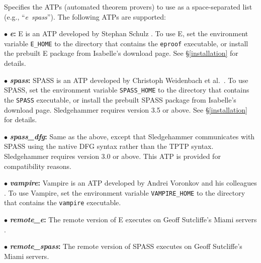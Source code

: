 \documentclass[a4paper,12pt]{article}
\begin{document}
\begin{enum}

Specifies the ATPs (automated theorem provers) to use as a space-separated list
(e.g., ``\textit{e}~\textit{spass}''). The following ATPs are supported:

\begin{enum}
\item[$\bullet$] \textbf{\textit{e}:} E is an ATP developed by Stephan Schulz
\cite{schulz-2002}. To use E, set the environment variable
\texttt{E\_HOME} to the directory that contains the \texttt{eproof} executable,
or install the prebuilt E package from Isabelle's download page. See
\S\ref{installation} for details.

\item[$\bullet$] \textbf{\textit{spass}:} SPASS is an ATP developed by Christoph
Weidenbach et al.\ \cite{weidenbach-et-al-2009}. To use SPASS, set the
environment variable \texttt{SPASS\_HOME} to the directory that contains the
\texttt{SPASS} executable, or install the prebuilt SPASS package from Isabelle's
download page. Sledgehammer requires version 3.5 or above. See
\S\ref{installation} for details.

\item[$\bullet$] \textbf{\textit{spass\_dfg}:} Same as the above, except that
Sledgehammer communicates with SPASS using the native DFG syntax rather than the
TPTP syntax. Sledgehammer requires version 3.0 or above. This ATP is provided
for compatibility reasons.

\item[$\bullet$] \textbf{\textit{vampire}:} Vampire is an ATP developed by
Andrei Voronkov and his colleagues \cite{riazanov-voronkov-2002}. To use
Vampire, set the environment variable \texttt{VAMPIRE\_HOME} to the directory
that contains the \texttt{vampire} executable.

\item[$\bullet$] \textbf{\textit{remote\_e}:} The remote version of E executes
on Geoff Sutcliffe's Miami servers \cite{sutcliffe-2000}.

\item[$\bullet$] \textbf{\textit{remote\_spass}:} The remote version of SPASS
executes on Geoff Sutcliffe's Miami servers.


\end{enum}
\end{enum}
\end{document}
